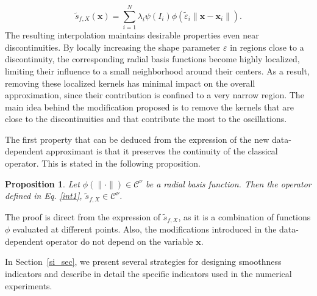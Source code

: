 \documentclass[preprint]{elsarticle}       %
\newtheorem{proposition}[theorem]{Proposition}
\begin{document}
\begin{equation}\label{int1}
\tilde s_{f,X}(\mathbf{x})  = \sum_{i=1}^N \lambda_i \psi( I_i)\phi(\tilde\varepsilon_i\|\mathbf{x} - \mathbf{x}_i\|).
\end{equation}
The resulting interpolation maintains desirable properties even near discontinuities. By locally increasing the shape parameter $\varepsilon$ in regions close to a discontinuity, the corresponding radial basis functions become highly localized, limiting their influence to a small neighborhood around their centers. As a result, removing these localized kernels has minimal impact on the overall approximation, since their contribution is confined to a very narrow region. The main idea behind the modification proposed is to remove the kernels that are close to the discontinuities and that contribute the most to the oscillations. 

The first property that can be deduced from the expression of the new data-dependent approximant is that it preserves the continuity of the classical operator. This is stated in the following proposition.

\begin{proposition}
Let $\phi(\|\cdot\|)\in \mathcal{C}^\nu$ be a radial basis function. Then the operator defined in Eq. \eqref{int1}, $\tilde s_{f,X}\in \mathcal{C}^\nu$. 
\end{proposition}
The proof is direct from the expression of $\tilde s_{f,X}$, as it is a combination of functions $\phi$ evaluated at different points. Also, the modifications introduced in the data-dependent operator do not depend on the variable $\mathbf{x}$.




In Section~\ref{si_sec}, we present several strategies for designing smoothness indicators and describe in detail the specific indicators used in the numerical experiments.

\end{document}
